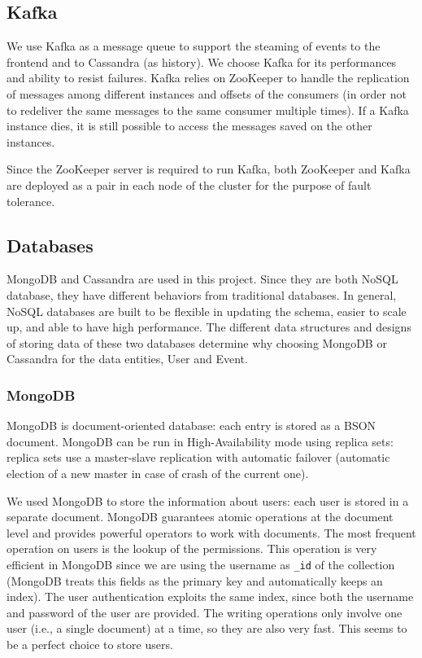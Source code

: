 \subsection{Kafka}
We use Kafka as a message queue to support the steaming of events to the frontend and to Cassandra (as history).
We choose Kafka for its performances and ability to resist failures.
Kafka relies on ZooKeeper to handle the replication of messages among different instances and offsets of the consumers (in order not to redeliver the same messages to the same consumer multiple times).
If a Kafka instance dies, it is still possible to access the messages saved on the other instances.

Since the ZooKeeper server is required to run Kafka, both ZooKeeper and Kafka are deployed as a pair in each node of the cluster for the purpose of fault tolerance.


\subsection{Databases}
MongoDB and Cassandra are used in this project.
Since they are both NoSQL database, they have different behaviors from traditional databases.
In general, NoSQL databases are built to be flexible in updating the schema, easier to scale up, and able to have high performance.
The different data structures and designs of storing data of these two databases determine why choosing MongoDB or Cassandra for the data entities, User and Event.

\subsubsection{MongoDB}
MongoDB is document-oriented database: each entry is stored as a BSON document.
MongoDB can be run in High-Availability mode using replica sets:
replica sets use a master-slave replication with automatic failover (automatic election of a new master in case of crash of the current one).

We used MongoDB to store the information about users: each user is stored in a separate document.
MongoDB guarantees atomic operations at the document level and provides powerful operators to work with documents.
The most frequent operation on users is the lookup of the permissions.
This operation is very efficient in MongoDB since we are using the username as \texttt{\_id} of the collection (MongoDB treats this fields as the primary key and automatically keeps an index).
The user authentication exploits the same index, since both the username and password of the user are provided.
The writing operations only involve one user (i.e., a single document) at a time, so they are also very fast.
This seems to be a perfect choice to store users.


